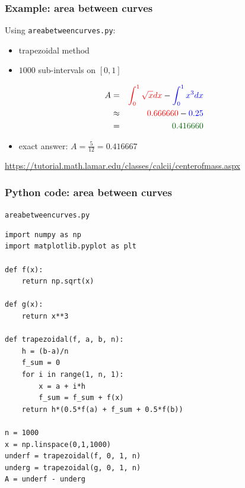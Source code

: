 \documentclass[english,14pt]{beamer}
\newcommand\red[1]{{\color{red} #1}}
\newcommand\blue[1]{{\color{blue} #1}}
\newcommand\darkGreen[1]{{\color{darkGreen} #1}}
\begin{document}

\begin{frame}[fragile]

\frametitle{Example: area between curves}

Using \texttt{areabetweencurves.py}:
\begin{itemize}
	\item trapezoidal method
	\item $1000$ sub-intervals on $[0,1]$
\end{itemize}

\begin{eqnarray*}
A & = & \red{\int_0^1 \sqrt{x} dx} - \blue{\int_0^1 x^3 dx} \\
& \approx & \red{0.666660} - \blue{0.25} \\
& = & \darkGreen{0.416660}
\end{eqnarray*}

\begin{itemize}
	\item exact answer: $A = \frac{5}{12} = 0.416667$
\end{itemize}
{\small
\href{https://tutorial.math.lamar.edu/classes/calcii/centerofmass.aspx}{https://tutorial.math.lamar.edu/classes/calcii/centerofmass.aspx}}

\end{frame}


\begin{frame}[fragile]

\frametitle{Python code: area between curves}
\vspace*{-3mm}
{\small
\texttt{areabetweencurves.py}}
\vspace*{-2mm}
\begin{lstlisting}[style=CStyle,basicstyle=\scriptsize]
import numpy as np
import matplotlib.pyplot as plt

def f(x):
    return np.sqrt(x)

def g(x):
    return x**3

def trapezoidal(f, a, b, n):
    h = (b-a)/n
    f_sum = 0
    for i in range(1, n, 1):
        x = a + i*h
        f_sum = f_sum + f(x)
    return h*(0.5*f(a) + f_sum + 0.5*f(b))

n = 1000
x = np.linspace(0,1,1000)
underf = trapezoidal(f, 0, 1, n)
underg = trapezoidal(g, 0, 1, n)
A = underf - underg
\end{lstlisting}

\end{frame}
\end{document}
